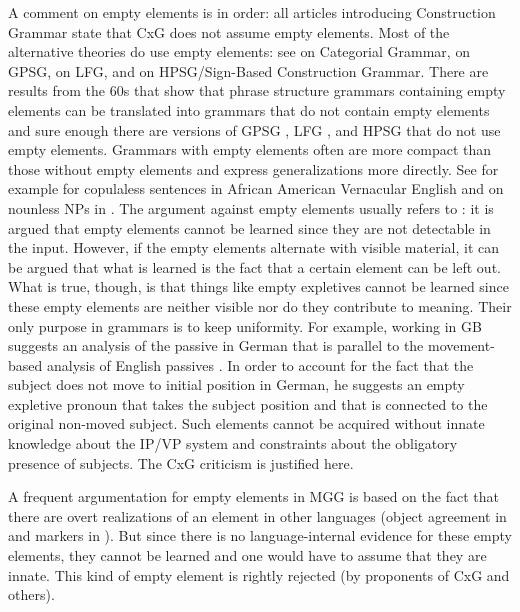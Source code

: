 \documentclass[output=paper
	        ,collection
	        ,collectionchapter
 	        ,biblatex
                ,babelshorthands
                ,newtxmath
                ,draftmode
                ,colorlinks, citecolor=brown
]{langscibook}
\begin{document}
A comment on empty elements is in order: all articles introducing Construction Grammar state that
CxG does not assume empty elements. Most of the alternative theories do use empty elements: see
\citet{KoenigE99a-u} on Categorial Grammar, \citet*[]{GKPS85a} on GPSG, \citet[]{Bresnan2001a} on LFG, \citet{Bender2000a} and \citet*[]{SWB2003a} on HPSG/Sign-Based
Construction Grammar. There are results from the 60s that show that phrase structure grammars
containing empty elements can be translated into grammars that do not contain empty elements
\citep*[, Lemma~4.1]{BHPS61a} and sure enough there are versions of GPSG \citep[--77]{Uszkoreit87a}, LFG \citep{KZ89a,DKK2001a-u}, and HPSG \parencites{BMS2001a}[]{Sag2010b} that do not use empty elements. Grammars with empty elements often are more compact than
those without empty elements and express generalizations more directly. See for example
\citet{Bender2000a} for copulaless sentences in African American Vernacular
English and \citet{Mueller2004e} on nounless NPs in
. The argument against empty elements usually refers to : it
is argued that empty elements cannot be learned since they are not detectable in the input. However,
if the empty elements alternate with visible material, it can be argued that what is learned is the
fact that a certain element can be left out. What is true, though, is that things like empty
expletives cannot be learned since these empty elements are neither visible nor do they contribute to
meaning. Their only purpose in grammars is to keep uniformity. For example, \citet{Grewendorf93}
working in GB suggests an analysis of the passive in German that is parallel to the movement-based analysis of English
passives \citep[]{Chomsky81a}. In order to account for the fact that the subject does not move to
initial position in German, he suggests an empty expletive pronoun that takes the subject position and that is connected to the original
non-moved subject. Such elements cannot be acquired without innate knowledge about the IP/VP system and
constraints about the obligatory presence of subjects. The CxG criticism is justified here.

A frequent argumentation for empty elements in MGG is based on the fact that there are overt
realizations of an element in other languages (\eg object agreement in  and  markers in
). But since there is no language-internal evidence for these empty elements, they cannot be
learned and one would have to assume that they are innate. This kind of empty element is rightly
rejected (by proponents of CxG and others).
\end{document}
